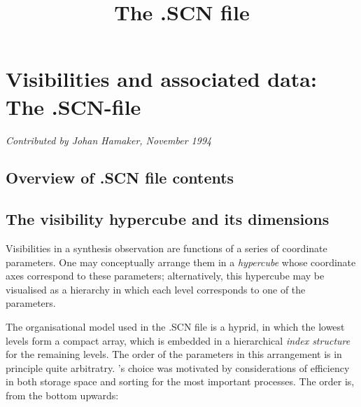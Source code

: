 % 
% 
% 
\newcommand{\bi}{ \begin{itemize} } 
\newcommand{\ei}{ \end{itemize} } 
\newcommand{\bn}{ \begin{enumerate} } 
\newcommand{\en}{ \end{enumerate} } 
\newcommand{\eg}{ {\em e.g. } } 

\title{ The .SCN file } 
\maketitle 

\chapter{ Visibilities and associated data: The .SCN-file } 

{\par \em Contributed by Johan Hamaker, November 1994 \centering \par} 

\tableofcontents 

\section{ Overview of .SCN file contents} 
\label{.scn.file} 

 

\section{ The visibility hypercube and its dimensions } 
\label{.hypercube} 

 

        Visibilities in a synthesis observation are functions of a series of
coordinate parameters. One may conceptually arrange them in a {\em hypercube}
whose coordinate axes correspond to these parameters; alternatively, this
hypercube may be visualised as a hierarchy in which each level corresponds to
one of the parameters. 

        The organisational model used in the .SCN file is a hyprid, in which
the lowest levels form a compact array, which is embedded in a hierarchical
{\em index structure} for the remaining levels. The order of the parameters in
this arrangement is in principle quite arbitratry. \NEWSTAR's choice was
motivated by considerations of efficiency in both storage space and sorting for
the most important processes. The order is, from the bottom upwards: 


